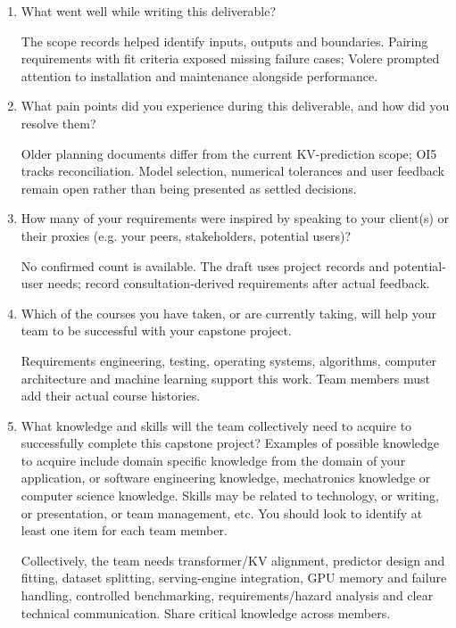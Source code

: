 \documentclass[12pt]{article}
\begin{document}
\begin{enumerate}
\item What went well while writing this deliverable?
\par
The scope records helped identify inputs, outputs and boundaries. Pairing
requirements with fit criteria exposed missing failure cases; Volere prompted
attention to installation and maintenance alongside performance.

\item What pain points did you experience during this deliverable, and how did
  you resolve them?
\par
Older planning documents differ from the current KV-prediction scope;
OI5 tracks reconciliation. Model selection, numerical tolerances and user
feedback remain open rather than being presented as settled decisions.

\item How many of your requirements were inspired by speaking to your
  client(s) or their proxies (e.g. your peers, stakeholders, potential users)?
\par
No confirmed count is available. The draft uses project records and
potential-user needs; record consultation-derived requirements after actual feedback.

\item Which of the courses you have taken, or are currently taking, will help
  your team to be successful with your capstone project.
\par
Requirements engineering, testing, operating systems, algorithms,
computer architecture and machine learning support this work. Team members
must add their actual course histories.

\item What knowledge and skills will the team collectively need to acquire to
  successfully complete this capstone project?  Examples of possible knowledge
  to acquire include domain specific knowledge from the domain of your
  application, or software engineering knowledge, mechatronics knowledge or
  computer science knowledge.  Skills may be related to technology, or writing,
  or presentation, or team management, etc.  You should look to identify at
  least one item for each team member.
\par
Collectively, the team needs transformer/KV alignment, predictor design
and fitting, dataset splitting, serving-engine integration, GPU memory and
failure handling, controlled benchmarking, requirements/hazard analysis and
clear technical communication. Share critical knowledge across members.


\end{enumerate}
\end{document}
